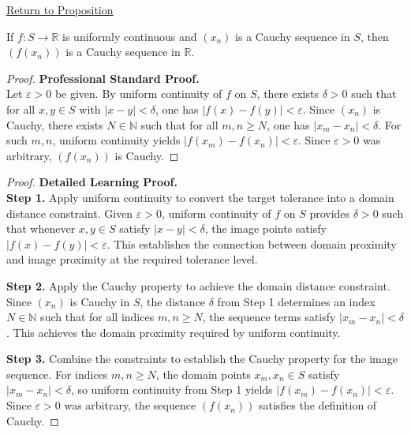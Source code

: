 \newpage
{}
\label{prf:uniform-continuity-cauchy}

\begin{remark*}[Return]
\hyperref[prop:uniform-continuity-cauchy]{Return to Proposition}
\end{remark*}

\begin{theorem*}
If $f \colon S \to \mathbb{R}$ is uniformly continuous and $(x_{n})$ is a Cauchy sequence in $S$, then $(f(x_{n}))$ is a Cauchy sequence in $\mathbb{R}$.
\end{theorem*}

\begin{proof}
\textbf{Professional Standard Proof.}~\\
Let $\varepsilon > 0$ be given. By uniform continuity of $f$ on $S$, there exists $\delta > 0$ such that for all $x, y \in S$ with $|x - y| < \delta$, one has $|f(x) - f(y)| < \varepsilon$. Since $(x_{n})$ is Cauchy, there exists $N \in \mathbb{N}$ such that for all $m, n \geq N$, one has $|x_{m} - x_{n}| < \delta$. For such $m, n$, uniform continuity yields $|f(x_{m}) - f(x_{n})| < \varepsilon$. Since $\varepsilon > 0$ was arbitrary, $(f(x_{n}))$ is Cauchy.
\end{proof}

\begin{proof}
\textbf{Detailed Learning Proof.}~\\

\textbf{Step 1.} Apply uniform continuity to convert the target tolerance into a domain distance constraint. Given $\varepsilon > 0$, uniform continuity of $f$ on $S$ provides $\delta > 0$ such that whenever $x, y \in S$ satisfy $|x - y| < \delta$, the image points satisfy $|f(x) - f(y)| < \varepsilon$. This establishes the connection between domain proximity and image proximity at the required tolerance level.

\textbf{Step 2.} Apply the Cauchy property to achieve the domain distance constraint. Since $(x_{n})$ is Cauchy in $S$, the distance $\delta$ from Step 1 determines an index $N \in \mathbb{N}$ such that for all indices $m, n \geq N$, the sequence terms satisfy $|x_{m} - x_{n}| < \delta$. This achieves the domain proximity required by uniform continuity.

\textbf{Step 3.} Combine the constraints to establish the Cauchy property for the image sequence. For indices $m, n \geq N$, the domain points $x_{m}, x_{n} \in S$ satisfy $|x_{m} - x_{n}| < \delta$, so uniform continuity from Step 1 yields $|f(x_{m}) - f(x_{n})| < \varepsilon$. Since $\varepsilon > 0$ was arbitrary, the sequence $(f(x_{n}))$ satisfies the definition of Cauchy.
\end{proof}


